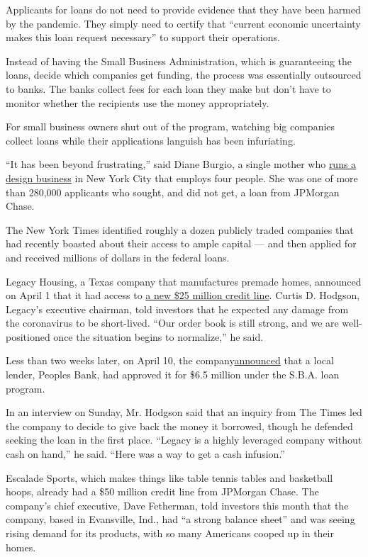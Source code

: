 Applicants for loans do not need to provide evidence that they have been
harmed by the pandemic. They simply need to certify that ``current
economic uncertainty makes this loan request necessary'' to support
their operations.

Instead of having the Small Business Administration, which is
guaranteeing the loans, decide which companies get funding, the process
was essentially outsourced to banks. The banks collect fees for each
loan they make but don't have to monitor whether the recipients use the
money appropriately.

For small business owners shut out of the program, watching big
companies collect loans while their applications languish has been
infuriating.

``It has been beyond frustrating,'' said Diane Burgio, a single mother
who \href{http://dianeburgiodesign.com/}{runs a design business} in New
York City that employs four people. She was one of more than 280,000
applicants who sought, and did not get, a loan from JPMorgan Chase.

The New York Times identified roughly a dozen publicly traded companies
that had recently boasted about their access to ample capital --- and
then applied for and received millions of dollars in the federal loans.

Legacy Housing, a Texas company that manufactures premade homes,
announced on April 1 that it had access to
\href{https://investors.legacyhousingcorp.com/news-releases/news-release-details/legacy-housing-corporation-announces-new-credit-facility}{a
new \$25 million credit line}. Curtis D. Hodgson, Legacy's executive
chairman, told investors that he expected any damage from the
coronavirus to be short-lived. ``Our order book is still strong, and we
are well-positioned once the situation begins to normalize,'' he said.

Less than two weeks later, on April 10, the
company\href{https://www.sec.gov/Archives/edgar/data/1436208/000155837020003911/tmb-20200410x8k.htm}{announced}
that a local lender, Peoples Bank, had approved it for \$6.5 million
under the S.B.A. loan program.

In an interview on Sunday, Mr. Hodgson said that an inquiry from The
Times led the company to decide to give back the money it borrowed,
though he defended seeking the loan in the first place. ``Legacy is a
highly leveraged company without cash on hand,'' he said. ``Here was a
way to get a cash infusion.''

Escalade Sports, which makes things like table tennis tables and
basketball hoops, already had a \$50 million credit line from JPMorgan
Chase. The company's chief executive, Dave Fetherman, told investors
this month that the company, based in Evansville, Ind., had ``a strong
balance sheet'' and was seeing rising demand for its products, with so
many Americans cooped up in their homes.

